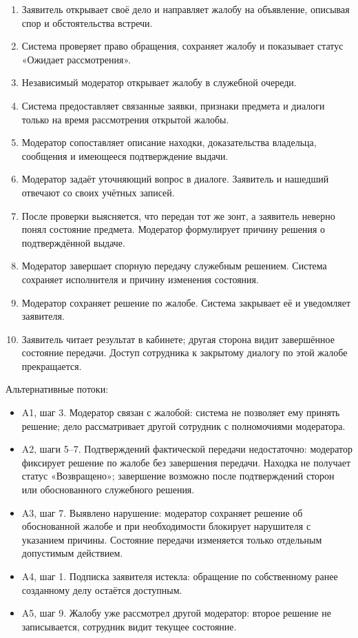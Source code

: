 \begin{enumerate}
\item Заявитель открывает своё дело и направляет жалобу на объявление, описывая спор и обстоятельства встречи.
\item Система проверяет право обращения, сохраняет жалобу и показывает статус «Ожидает рассмотрения».
\item Независимый модератор открывает жалобу в служебной очереди.
\item Система предоставляет связанные заявки, признаки предмета и диалоги только на время рассмотрения открытой жалобы.
\item Модератор сопоставляет описание находки, доказательства владельца, сообщения и имеющееся подтверждение выдачи.
\item Модератор задаёт уточняющий вопрос в диалоге. Заявитель и нашедший отвечают со своих учётных записей.
\item После проверки выясняется, что передан тот же зонт, а заявитель неверно понял состояние предмета. Модератор формулирует причину решения о подтверждённой выдаче.
\item Модератор завершает спорную передачу служебным решением. Система сохраняет исполнителя и причину изменения состояния.
\item Модератор сохраняет решение по жалобе. Система закрывает её и уведомляет заявителя.
\item Заявитель читает результат в кабинете; другая сторона видит завершённое состояние передачи. Доступ сотрудника к закрытому диалогу по этой жалобе прекращается.
\end{enumerate}

Альтернативные потоки:

\begin{itemize}
\item A1, шаг 3. Модератор связан с жалобой: система не позволяет ему принять решение; дело рассматривает другой сотрудник с полномочиями модератора.
\item A2, шаги 5–7. Подтверждений фактической передачи недостаточно: модератор фиксирует решение по жалобе без завершения передачи. Находка не получает статус «Возвращено»; завершение возможно после подтверждений сторон или обоснованного служебного решения.
\item A3, шаг 7. Выявлено нарушение: модератор сохраняет решение об обоснованной жалобе и при необходимости блокирует нарушителя с указанием причины. Состояние передачи изменяется только отдельным допустимым действием.
\item A4, шаг 1. Подписка заявителя истекла: обращение по собственному ранее созданному делу остаётся доступным.
\item A5, шаг 9. Жалобу уже рассмотрел другой модератор: второе решение не записывается, сотрудник видит текущее состояние.
\end{itemize}

